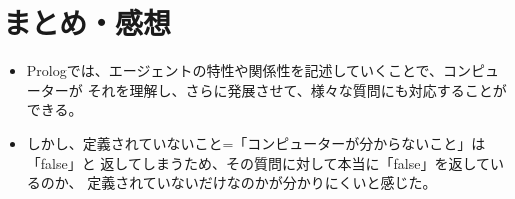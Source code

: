 \section{まとめ・感想}
\begin{itemize}
  \item Prologでは、エージェントの特性や関係性を記述していくことで、コンピューターが
  それを理解し、さらに発展させて、様々な質問にも対応することができる。
  \item しかし、定義されていないこと=「コンピューターが分からないこと」は「false」と
  返してしまうため、その質問に対して本当に「false」を返しているのか、
  定義されていないだけなのかが分かりにくいと感じた。
\end{itemize}

